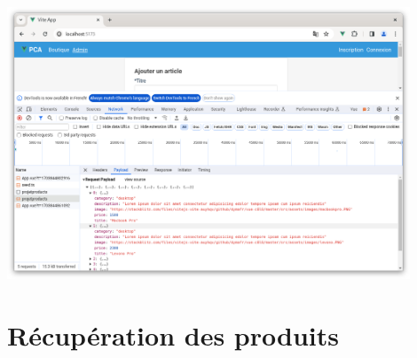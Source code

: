 \begin{center}
\includegraphics[width=12cm]{images/image36.png}
\end{center}


\section{Récupération des produits}

